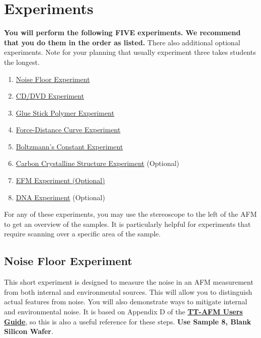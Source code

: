 \documentclass{../lab}
\newcommand{\afmuserguide}{\href{https://berkeley-physics111b.github.io/assets/pdf/oldwebsitestructure/AFMImages/TT_AFM\%20User-Guide-V2.2-600DPI.pdf}{\textbf{TT-AFM Users Guide}}}
\begin{document}
\pagebreak
\section{Experiments}
\label{sec:Experiments}
\textbf{You will perform the following FIVE experiments. We recommend that you do them in the order as listed.} There also additional optional experiments. Note for your planning that usually experiment three takes students the longest.

\begin{enumerate}

\item \hyperref[subsec:NoiseFloor]{Noise Floor Experiment} 

\item \hyperref[subsec:CD/DVD]{CD/DVD Experiment}

\item \hyperref[subsec:GlueStick]{Glue Stick Polymer Experiment}

\item \hyperref[subsec:ForceDistance]{Force-Distance Curve Experiment}

\item \hyperref[subsec:Boltzmann]{Boltzmann's Constant Experiment} 

\item \hyperref[subsec:CarbonCrystal]{Carbon Crystalline Structure Experiment} (Optional)

\item \hyperref[subsec:EFM]{EFM Experiment (Optional)}

\item \hyperref[subsec:DNA]{DNA Experiment} (Optional)

\end{enumerate}

For any of these experiments, you may use the stereoscope to the left of the AFM to get an overview of the samples. It is particularly helpful for experiments that require scanning over a specific area of the sample.

\subsection{Noise Floor Experiment}
\label{subsec:NoiseFloor}

This short experiment is designed to measure the noise in an AFM measurement from both internal and environmental sources. This will allow you to distinguish actual features from noise. You will also demonstrate ways to mitigate internal and environmental noise. It is based on Appendix D of the \afmuserguide, so this is also a useful reference for these steps. \textbf{Use Sample 8, Blank Silicon Wafer}.
\end{document}
